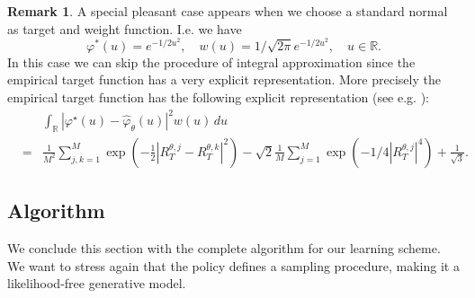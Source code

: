 \documentclass[reqno, 11pt]{amsart}%
\newcommand\RR{\mathbb R}
\theoremstyle{definition}
\newtheorem{remark}[theorem]{Remark}
\begin{document}
\begin{remark}\label{rem:Epps}
A special pleasant case appears when we choose a standard normal as target and weight function. I.e. we have
$$ \varphi^*(u) = e^{-1/2 u^2}, \quad w(u)= 1/\sqrt{2\pi} e^{-1/2 u^2}, \quad u\in\RR.$$
In this case we can skip the  procedure of integral approximation  since the empirical target function has a very explicit representation. More precisely
the empirical target function has the following explicit representation (see e.g. \cite{epps1983test,baringhaus1988consistent}):
\begin{eqnarray*}
  && \int_{\mathbb{R}} \left|      \varphi^\star(u)-\hat\varphi_\theta(u) \right|^2 w(u) \, du\\
&=& \frac{1}{M^2} \sum_{j,k=1}^M \exp(-\frac12 |R_T^{\theta,j}-R_T^{\theta,k}|^2) -\sqrt{2}  \frac1M  \sum_{j=1}^M \exp(-1/4 |R_T^{\theta,j}|^4) + \frac{1}{\sqrt{3}}.
\end{eqnarray*} 
\end{remark}
\subsection{Algorithm}
We conclude this section with the complete algorithm for our learning scheme. We want to stress again that the policy defines a sampling procedure, making it a likelihood-free generative model. 
\end{document}
